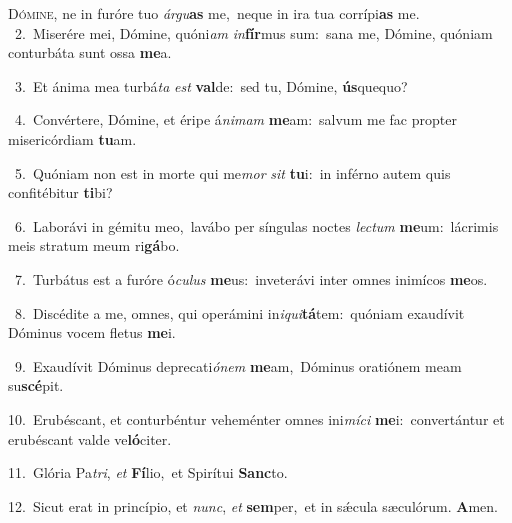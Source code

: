\lettrine{\initial\textcolor{\initialcolor}{D}}{ómine,} ne in furóre tuo \textit{ár}\-\textit{gu}\textbf{as} me,~\star neque in ira tua corrípi\textbf{as} me.\\
{\numbfont\textcolor{\numbcolor}{~2.}}~Miserére mei, Dómine, quóni\textit{am} \textit{in}\-\textbf{fír}mus sum:~\star sana me, Dómine, quóniam conturbáta sunt ossa \textbf{me}\-a.\par
{\numbfont\textcolor{\numbcolor}{~3.}}~Et ánima mea turbá\textit{ta} \textit{est} \textbf{val}\-de:~\star sed tu, Dómine, \textbf{ús}\-quequo?\par
{\numbfont\textcolor{\numbcolor}{~4.}}~Convértere, Dómine, et éripe á\-\textit{ni}\-\textit{mam} \textbf{me}\-am:~\star salvum me fac propter misericórdiam \textbf{tu}\-am.\par
{\numbfont\textcolor{\numbcolor}{~5.}}~Quóniam non est in morte qui me\textit{mor} \textit{sit} \textbf{tu}\-i:~\star in inférno autem quis confitébitur \textbf{ti}\-bi?\par
{\numbfont\textcolor{\numbcolor}{~6.}}~Laborávi in gémitu meo,~\dagger lavábo per síngulas noctes \textit{lec}\-\textit{tum} \textbf{me}\-um:~\star lácrimis meis stratum meum ri\-\textbf{gá}\-bo.\par
{\numbfont\textcolor{\numbcolor}{~7.}}~Turbátus est a furóre ó\-\textit{cu}\-\textit{lus} \textbf{me}\-us:~\star inveterávi inter omnes inimícos \textbf{me}\-os.\par
{\numbfont\textcolor{\numbcolor}{~8.}}~Discédite a me, omnes, qui operámini in\-\textit{i}\-\textit{qui}\textbf{tá}tem:~\star quóniam exaudívit Dóminus vocem fletus \textbf{me}\-i.\par
{\numbfont\textcolor{\numbcolor}{~9.}}~Exaudívit Dóminus deprecati\-\textit{ó}\-\textit{nem} \textbf{me}\-am,~\star Dóminus oratiónem meam su\-\textbf{scé}\-pit.\par
{\numbfont\textcolor{\numbcolor}{10.}}~Erubéscant, et conturbéntur veheménter omnes ini\-\textit{mí}\-\textit{ci} \textbf{me}\-i:~\star convertántur et erubéscant valde ve\-\textbf{ló}\-citer.\par
{\numbfont\textcolor{\numbcolor}{11.}}~Glória Pa\-\textit{tri}\-, \textit{et} \textbf{Fí}\-lio,~\star et Spirítui \textbf{Sanc}\-to.\par
{\numbfont\textcolor{\numbcolor}{12.}}~Sicut erat in princípio, et \textit{nunc}\-, \textit{et} \textbf{sem}\-per,~\star et in sǽcula sæculórum. \textbf{A}\-men.\par
